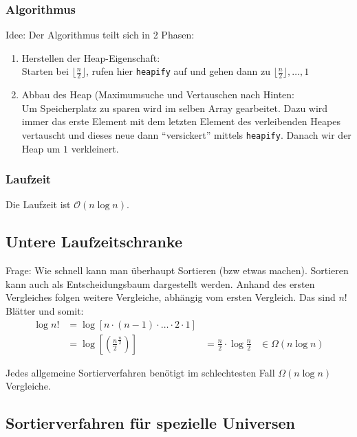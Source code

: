 \documentclass{scrartcl}
\begin{document}

\subsubsection{Algorithmus}
Idee: Der Algorithmus teilt sich in 2 Phasen:
\begin{enumerate}
	\item Herstellen der Heap-Eigenschaft: \\
	Starten bei $\lfloor \frac{n}{2} \rfloor$, rufen hier \texttt{heapify} auf und gehen dann zu $\lfloor \frac{n}{2} \rfloor, \dots,1$
	\item Abbau des Heap (Maximumsuche und Vertauschen nach Hinten: \\
	Um Speicherplatz zu sparen wird im selben Array gearbeitet. Dazu wird immer das erste Element mit dem letzten Element des verleibenden Heapes vertauscht und dieses neue dann "`versickert"' mittels \texttt{heapify}. Danach wir der Heap um $1$ verkleinert.
\end{enumerate}

\subsubsection{Laufzeit}
Die Laufzeit ist $\mathcal{O}(n \log n)$.

\subsection{Untere Laufzeitschranke}
Frage: Wie schnell kann man überhaupt Sortieren {\tiny(bzw etwas machen)}. Sortieren kann auch als Entscheidungsbaum dargestellt werden. Anhand des ersten Vergleiches folgen weitere Vergleiche, abhängig vom ersten Vergleich. Das sind $n!$ Blätter und somit:
\begin{align*}
\log n! &= \log[n\cdot (n-1) \cdot \ldots \cdot 2 \cdot 1]\\
        &=\log \left[ \left( \frac{n}{2}^{\frac{n}{2}} \right) \right]
        &= \frac{n}{2}\cdot\log\frac{n}{2}
        &\in \Omega(n\log n)
\end{align*}
\begin{shaded}
Jedes allgemeine Sortierverfahren benötigt im schlechtesten Fall $\Omega(n\log n)$ Vergleiche.
\end{shaded}

\subsection{Sortierverfahren für spezielle Universen}
\end{document}
